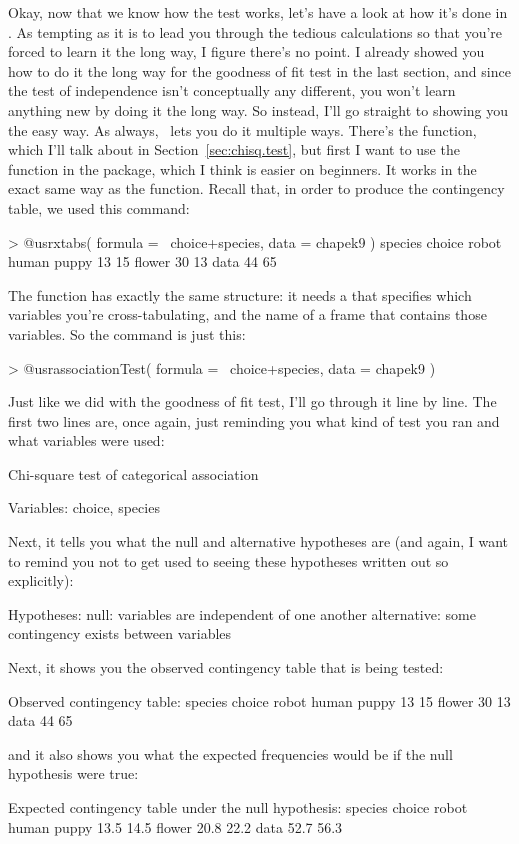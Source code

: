 

Okay, now that we know how the test works, let's have a look at how it's done in \R. As tempting as it is to lead you through the tedious calculations so that you're forced to learn it the long way, I figure there's no point. I already showed you how to do it the long way for the goodness of fit test in the last section, and since the test of independence isn't conceptually any different, you won't learn anything new by doing it the long way. So instead, I'll go straight to showing you the easy way. As always, \R\ lets you do it multiple ways. There's the  function, which I'll talk about in Section~\ref{sec:chisq.test}, but first I want to use the  function in the  package, which I think is easier on beginners. It works in the exact same way as the  function. Recall that, in order to produce the contingency table, we used this command:
\begin{rblock1}
> @usr{xtabs( formula = ~choice+species, data = chapek9 )}
        species
choice   robot human
  puppy     13    15
  flower    30    13
  data      44    65
\end{rblock1}
The  function has exactly the same structure: it needs a  that specifies which variables you're cross-tabulating, and the name of a  frame that contains those variables. So the command is just this:
\begin{rblock1}
> @usr{associationTest( formula = ~choice+species, data = chapek9 )}
\end{rblock1}
Just like we did with the goodness of fit test, I'll go through it line by line. The first two lines are, once again, just reminding you what kind of test you ran and what variables were used:
\begin{rblock1}
     Chi-square test of categorical association

Variables:   choice, species 
\end{rblock1}
Next, it tells you what the null and alternative hypotheses are (and again, I want to remind you not to get used to seeing these hypotheses written out so explicitly):
\begin{rblock1}
Hypotheses: 
   null:        variables are independent of one another
   alternative: some contingency exists between variables
\end{rblock1}
Next, it shows you the observed contingency table that is being tested:
\begin{rblock1}
Observed contingency table:
        species
choice   robot human
  puppy     13    15
  flower    30    13
  data      44    65
\end{rblock1}
and it also shows you what the expected frequencies would be if the null hypothesis were true:
\begin{rblock1}
Expected contingency table under the null hypothesis:
        species
choice   robot human
  puppy   13.5  14.5
  flower  20.8  22.2
  data    52.7  56.3
\end{rblock1}  

